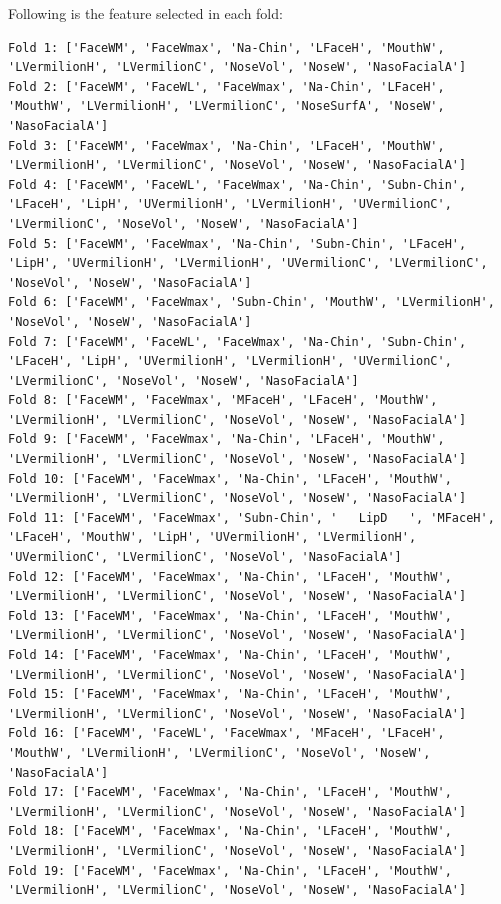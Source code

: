 \documentclass[12pt,a4paper]{article}
\begin{document}
Following is the feature selected in each fold:
\begin{verbatim}
Fold 1: ['FaceWM', 'FaceWmax', 'Na-Chin', 'LFaceH', 'MouthW', 'LVermilionH', 'LVermilionC', 'NoseVol', 'NoseW', 'NasoFacialA']
Fold 2: ['FaceWM', 'FaceWL', 'FaceWmax', 'Na-Chin', 'LFaceH', 'MouthW', 'LVermilionH', 'LVermilionC', 'NoseSurfA', 'NoseW', 'NasoFacialA']
Fold 3: ['FaceWM', 'FaceWmax', 'Na-Chin', 'LFaceH', 'MouthW', 'LVermilionH', 'LVermilionC', 'NoseVol', 'NoseW', 'NasoFacialA']
Fold 4: ['FaceWM', 'FaceWL', 'FaceWmax', 'Na-Chin', 'Subn-Chin', 'LFaceH', 'LipH', 'UVermilionH', 'LVermilionH', 'UVermilionC', 'LVermilionC', 'NoseVol', 'NoseW', 'NasoFacialA']
Fold 5: ['FaceWM', 'FaceWmax', 'Na-Chin', 'Subn-Chin', 'LFaceH', 'LipH', 'UVermilionH', 'LVermilionH', 'UVermilionC', 'LVermilionC', 'NoseVol', 'NoseW', 'NasoFacialA']
Fold 6: ['FaceWM', 'FaceWmax', 'Subn-Chin', 'MouthW', 'LVermilionH', 'NoseVol', 'NoseW', 'NasoFacialA']
Fold 7: ['FaceWM', 'FaceWL', 'FaceWmax', 'Na-Chin', 'Subn-Chin', 'LFaceH', 'LipH', 'UVermilionH', 'LVermilionH', 'UVermilionC', 'LVermilionC', 'NoseVol', 'NoseW', 'NasoFacialA']
Fold 8: ['FaceWM', 'FaceWmax', 'MFaceH', 'LFaceH', 'MouthW', 'LVermilionH', 'LVermilionC', 'NoseVol', 'NoseW', 'NasoFacialA']
Fold 9: ['FaceWM', 'FaceWmax', 'Na-Chin', 'LFaceH', 'MouthW', 'LVermilionH', 'LVermilionC', 'NoseVol', 'NoseW', 'NasoFacialA']
Fold 10: ['FaceWM', 'FaceWmax', 'Na-Chin', 'LFaceH', 'MouthW', 'LVermilionH', 'LVermilionC', 'NoseVol', 'NoseW', 'NasoFacialA']
Fold 11: ['FaceWM', 'FaceWmax', 'Subn-Chin', '   LipD   ', 'MFaceH', 'LFaceH', 'MouthW', 'LipH', 'UVermilionH', 'LVermilionH', 'UVermilionC', 'LVermilionC', 'NoseVol', 'NasoFacialA']
Fold 12: ['FaceWM', 'FaceWmax', 'Na-Chin', 'LFaceH', 'MouthW', 'LVermilionH', 'LVermilionC', 'NoseVol', 'NoseW', 'NasoFacialA']
Fold 13: ['FaceWM', 'FaceWmax', 'Na-Chin', 'LFaceH', 'MouthW', 'LVermilionH', 'LVermilionC', 'NoseVol', 'NoseW', 'NasoFacialA']
Fold 14: ['FaceWM', 'FaceWmax', 'Na-Chin', 'LFaceH', 'MouthW', 'LVermilionH', 'LVermilionC', 'NoseVol', 'NoseW', 'NasoFacialA']
Fold 15: ['FaceWM', 'FaceWmax', 'Na-Chin', 'LFaceH', 'MouthW', 'LVermilionH', 'LVermilionC', 'NoseVol', 'NoseW', 'NasoFacialA']
Fold 16: ['FaceWM', 'FaceWL', 'FaceWmax', 'MFaceH', 'LFaceH', 'MouthW', 'LVermilionH', 'LVermilionC', 'NoseVol', 'NoseW', 'NasoFacialA']
Fold 17: ['FaceWM', 'FaceWmax', 'Na-Chin', 'LFaceH', 'MouthW', 'LVermilionH', 'LVermilionC', 'NoseVol', 'NoseW', 'NasoFacialA']
Fold 18: ['FaceWM', 'FaceWmax', 'Na-Chin', 'LFaceH', 'MouthW', 'LVermilionH', 'LVermilionC', 'NoseVol', 'NoseW', 'NasoFacialA']
Fold 19: ['FaceWM', 'FaceWmax', 'Na-Chin', 'LFaceH', 'MouthW', 'LVermilionH', 'LVermilionC', 'NoseVol', 'NoseW', 'NasoFacialA']

\end{verbatim}
\end{document}
